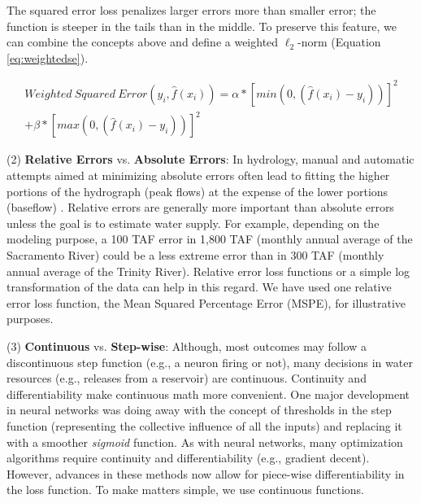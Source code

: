 The squared error loss penalizes larger errors more than smaller error; the function is steeper in the tails than in the middle. To preserve this feature, we can combine the concepts above and define a weighted $\ell_2$-norm (Equation \ref{eq:weightedse}). 

\begin{multline} \label{eq:weightedse}
	Weighted\ Squared\ Error(y_i,\hat{f}(x_i)) = \alpha*\left[min\left(0, (\hat{f}(x_i)-y_i)\right)\right]^2 \\
	+ \beta*\left[max\left(0, (\hat{f}(x_i)-y_i)\right)\right]^2
\end{multline}


%

(2) \textbf{Relative Errors} vs. \textbf{Absolute Errors}: In hydrology, manual and automatic attempts aimed at minimizing absolute errors often lead to fitting the higher portions of the hydrograph (peak flows) at the expense of the lower portions (baseflow) \cite{krause2005comparison}. Relative errors are generally more important than absolute errors unless the goal is to estimate water supply. For example, depending on the modeling purpose, a 100 TAF error in 1,800 TAF (monthly annual average of the Sacramento River) could be a less extreme error than in 300 TAF (monthly annual average of the Trinity River). Relative error loss functions or a simple log transformation of the data can help in this regard. We have used one relative error loss function, the Mean Squared Percentage Error (MSPE), for illustrative purposes. 

(3) \textbf{Continuous} vs. \textbf{Step-wise}: Although, most outcomes may follow a discontinuous step function (e.g., a neuron firing or not), many decisions in water resources (e.g., releases from a reservoir) are continuous. Continuity and differentiability make continuous math more convenient. One major development in neural networks was doing away with the concept of thresholds in the step function (representing the collective influence of all the inputs) and replacing it with a smoother \textit{sigmoid} function. As with neural networks, many optimization algorithms require continuity and differentiability (e.g., gradient decent). However, advances in these methods now allow for piece-wise differentiability in the loss function. To make matters simple, we use continuous functions. 

